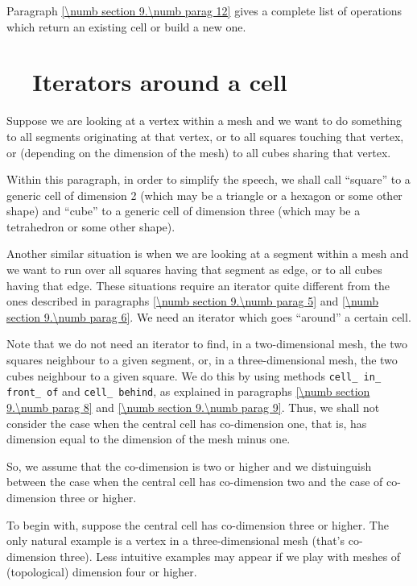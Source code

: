 Paragraph \ref{\numb section 9.\numb parag 12} gives a complete list of operations which return
an existing cell or build a new one.


\section{~~Iterators around a cell}\label{\numb section 9.\numb parag 10}

Suppose we are looking at a vertex within a mesh and we want to do something to all segments
originating at that vertex, or to all squares touching that vertex, or (depending on the
dimension of the mesh) to all cubes sharing that vertex.

Within this paragraph, in order to simplify the speech, we shall call ``square'' to a generic
cell of dimension 2 (which may be a triangle or a hexagon or some other shape) and
``cube'' to a generic cell of dimension three (which may be a tetrahedron or some other shape).

Another similar situation is when we are looking at a segment within a mesh and we want to
run over all squares having that segment as edge, or to all cubes having that edge.
These situations require an iterator quite different from the ones described in paragraphs
\ref{\numb section 9.\numb parag 5} and \ref{\numb section 9.\numb parag 6}.
We need an iterator which goes ``around'' a certain cell.

Note that we do not need an iterator to find, in a two-dimensional mesh, the two squares
neighbour to a given segment, or, in a three-dimensional mesh, the two cubes neighbour to
a given square.
We do this by using methods {\small\tt cell\_\,in\_\,front\_\,of} and {\small\tt cell\_\,behind},
as explained in paragraphs \ref{\numb section 9.\numb parag 8} and
\ref{\numb section 9.\numb parag 9}.
Thus, we shall not consider the case when the central cell has co-dimension one, that is,
has dimension equal to the dimension of the mesh minus one.

So, we assume that the co-dimension is two or higher and we distuinguish between
the case when the central cell has co-dimension two and the case of co-dimension
three or higher.

To begin with, suppose the central cell has co-dimension three or higher.
The only natural example is a vertex in a three-dimensional mesh (that's co-dimension three).
Less intuitive examples may appear if we play with meshes of (topological) dimension
four or higher.

